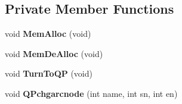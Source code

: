 \subsection*{Private Member Functions}
\begin{DoxyCompactItemize}
\item 
\mbox{\label{class_m_c_f_cplex_a0f5c43a76c4b5140beeaa378a659c772}} 
void {\bfseries Mem\+Alloc} (void)
\item 
\mbox{\label{class_m_c_f_cplex_a203fcfa70e86fa885526ea376b22b54a}} 
void {\bfseries Mem\+De\+Alloc} (void)
\item 
\mbox{\label{class_m_c_f_cplex_a4ec7f599f32ff6d3209ba1c8b09d103a}} 
void {\bfseries Turn\+To\+QP} (void)
\item 
\mbox{\label{class_m_c_f_cplex_a1d40e52b86856d0f1d73489741faa878}} 
void {\bfseries Q\+Pchgarcnode} (int name, int sn, int en)
\end{DoxyCompactItemize}
